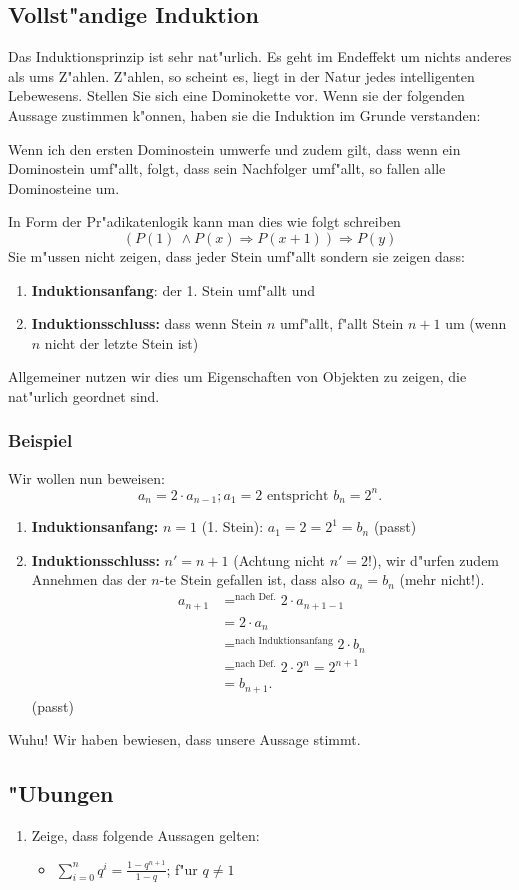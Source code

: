 \subsection{Vollst"andige Induktion}
Das Induktionsprinzip ist sehr nat"urlich. Es geht im Endeffekt um nichts anderes als ums Z"ahlen. Z"ahlen, so scheint es, liegt in der Natur jedes intelligenten Lebewesens. Stellen Sie sich eine Dominokette vor. Wenn sie der folgenden Aussage zustimmen k"onnen, haben sie die Induktion im Grunde verstanden:
\begin{center}
Wenn ich den ersten Dominostein umwerfe und zudem gilt, dass wenn ein Dominostein umf"allt, folgt, dass sein Nachfolger umf"allt, so fallen alle Dominosteine um.
\end{center}
In Form der Pr"adikatenlogik kann man dies wie folgt schreiben
\begin{equation*}
(P(1) \ \land P(x) \Rightarrow P(x+1)) \Rightarrow P(y)
\end{equation*}
Sie m"ussen nicht zeigen, dass jeder Stein umf"allt sondern sie zeigen dass:
\begin{enumerate}
\item \textbf{Induktionsanfang}: der 1. Stein umf"allt und
\item \textbf{Induktionsschluss:} dass wenn Stein $n$ umf"allt, f"allt Stein $n+1$ um (wenn $n$ nicht der letzte Stein ist)
\end{enumerate}
Allgemeiner nutzen wir dies um Eigenschaften von Objekten zu zeigen, die nat"urlich geordnet sind.

\subsubsection{Beispiel}
Wir wollen nun beweisen:
\begin{equation}
a_{n} = 2 \cdot a_{n-1}; a_1 = 2 \text{ entspricht } b_n = 2^n.
\end{equation}
\begin{enumerate}
\item \textbf{Induktionsanfang:} $n = 1$ (1. Stein): $ a_1 = 2 = 2^1 = b_n$ (passt)
\item \textbf{Induktionsschluss:} $n' = n + 1$ (Achtung nicht $n' = 2$!), wir d"urfen zudem Annehmen das der $n$-te Stein gefallen ist, dass also $a_n = b_n$ (mehr nicht!).
\begin{align*}
a_{n+1} &=^{\text{nach Def.}} 2 \cdot a_{n+1-1} \\
&=  2 \cdot a_{n} \\
&=^\text{nach Induktionsanfang} 2 \cdot b_n \\
&=^\text{nach Def.} 2 \cdot 2^n = 2^{n+1} \\
&= b_{n+1}.
\end{align*}
(passt)
\end{enumerate}
Wuhu! Wir haben bewiesen, dass unsere Aussage stimmt.

\subsection{"Ubungen}
\begin{enumerate}
\item Zeige, dass folgende Aussagen gelten:
\begin{itemize}
\item $\sum\limits_{i=0}^{n} q^i = \frac{1-q^{n+1}}{1-q}$; f"ur $q \neq 1$
\end{itemize}
\end{enumerate}
